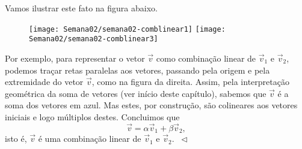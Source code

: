 \begin{ex}
	Vamos ilustrar este fato na figura abaixo.
	\begin{figure}[h!]
		\begin{center}
			\texttt{[image: Semana02/semana02-comblinear1]}
			\texttt{[image: Semana02/semana02-comblinear3]}
		\end{center}
	\end{figure}
	Por exemplo, para representar o vetor $\vec{v}$ como combinação linear de $\vec{v}_1$ e $\vec{v}_2$, podemos traçar retas paralelas aos vetores, passando pela origem e pela extremidade do vetor $\vec{v}$, como na figura da direita. Assim, pela interpretação geométrica da soma de vetores (ver início deste capítulo), sabemos que $\vec{v}$ é a soma dos vetores em azul. Mas estes, por construção, são colineares aos vetores iniciais e logo múltiplos destes. Concluimos que
	\begin{equation}
	\vec{v} = \alpha \vec{v}_1 + \beta \vec{v}_2,
	\end{equation} isto é, $\vec{v}$ é uma combinação linear de $\vec{v}_1$ e $\vec{v}_2$. $\ \lhd$
\end{ex}



